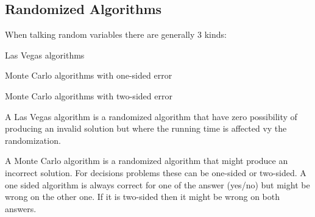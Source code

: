\subsection{Randomized Algorithms}

When talking random variables there are generally 3 kinds:
\begin{enumerate*}
  \item Las Vegas algorithms
  \item Monte Carlo algorithms with one-sided error
  \item Monte Carlo algorithms with two-sided error
\end{enumerate*}

A Las Vegas algorithm is a randomized algorithm that have zero possibility of
producing an invalid solution but where the running time is affected vy the
randomization.

A Monte Carlo algorithm is a randomized algorithm that might produce an
incorrect solution. For decisions problems these can be one-sided or
two-sided. A one sided algorithm is always correct for one of the answer
(yes/no) but might be wrong on the other one. If it is two-sided then it might
be wrong on both answers.


